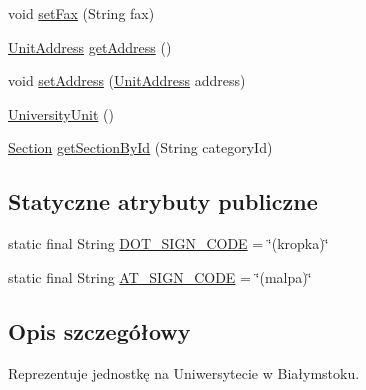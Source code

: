 \begin{DoxyCompactItemize}
\item 
void \hyperlink{classpl_1_1edu_1_1uwb_1_1mobiuwb_1_1parsers_1_1xml_1_1parser_1_1_university_unit_ac44973c694bd5be0bc223c693e895c74}{set\+Fax} (String fax)
\item 
\hyperlink{classpl_1_1edu_1_1uwb_1_1mobiuwb_1_1parsers_1_1xml_1_1parser_1_1result_1_1model_1_1_unit_address}{Unit\+Address} \hyperlink{classpl_1_1edu_1_1uwb_1_1mobiuwb_1_1parsers_1_1xml_1_1parser_1_1_university_unit_ad2a618e8e2949ad8873b56be688390c9}{get\+Address} ()
\item 
void \hyperlink{classpl_1_1edu_1_1uwb_1_1mobiuwb_1_1parsers_1_1xml_1_1parser_1_1_university_unit_a94e21c6701691c332062b518844fb356}{set\+Address} (\hyperlink{classpl_1_1edu_1_1uwb_1_1mobiuwb_1_1parsers_1_1xml_1_1parser_1_1result_1_1model_1_1_unit_address}{Unit\+Address} address)
\item 
\hyperlink{classpl_1_1edu_1_1uwb_1_1mobiuwb_1_1parsers_1_1xml_1_1parser_1_1_university_unit_a770d0dd2fe8c0e19d055a88063ded150}{University\+Unit} ()
\item 
\hyperlink{classpl_1_1edu_1_1uwb_1_1mobiuwb_1_1parsers_1_1xml_1_1parser_1_1_section}{Section} \hyperlink{classpl_1_1edu_1_1uwb_1_1mobiuwb_1_1parsers_1_1xml_1_1parser_1_1_university_unit_a9a7f58bdedae44af10609679ae14ac32}{get\+Section\+By\+Id} (String category\+Id)
\end{DoxyCompactItemize}
\subsection*{Statyczne atrybuty publiczne}
\begin{DoxyCompactItemize}
\item 
static final String \hyperlink{classpl_1_1edu_1_1uwb_1_1mobiuwb_1_1parsers_1_1xml_1_1parser_1_1_university_unit_a30bee36a042028b337f13b3d0e6ac35e}{D\+O\+T\+\_\+\+S\+I\+G\+N\+\_\+\+C\+O\+D\+E} = \char`\"{}(kropka)\char`\"{}
\item 
static final String \hyperlink{classpl_1_1edu_1_1uwb_1_1mobiuwb_1_1parsers_1_1xml_1_1parser_1_1_university_unit_abb65519b0b8526c627c25eeed32cbdcf}{A\+T\+\_\+\+S\+I\+G\+N\+\_\+\+C\+O\+D\+E} = \char`\"{}(malpa)\char`\"{}
\end{DoxyCompactItemize}


\subsection{Opis szczegółowy}
Reprezentuje jednostkę na Uniwersytecie w Białymstoku. 

